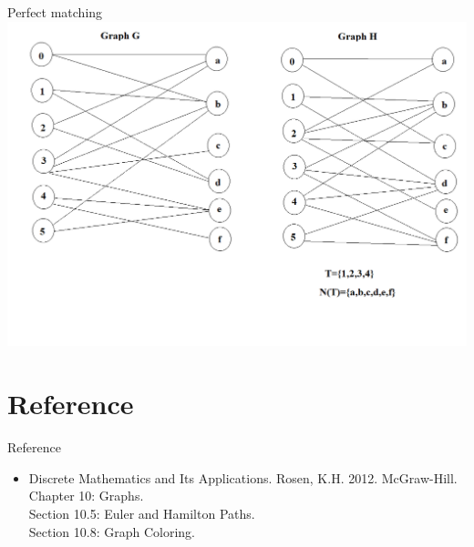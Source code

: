 \documentclass{beamer}
\theoremstyle{definition}
\begin{document}
\begin{frame}{Perfect matching}
    \centering \includegraphics[width=.7\linewidth]{p7.PNG}
\end{frame}

\section*{Reference}

\begin{frame}{Reference}
    \begin{itemize}
        \item Discrete Mathematics and Its Applications. Rosen, K.H. 2012. McGraw-Hill. \\
        Chapter 10: Graphs. \\
        Section 10.5: Euler and Hamilton Paths. \\
        Section 10.8: Graph Coloring.
    \end{itemize}
\end{frame}
\end{document}
